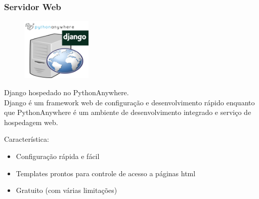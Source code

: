 \documentclass{beamer}
\begin{document}
\begin{frame}
\frametitle{Servidor Web}
\begin{minipage}{\textwidth}

	\begin{figure}
		\begin{center}
				\includegraphics[width=0.3\textwidth]{web-server-pa-django.png}
		\end{center}
	\end{figure}
	
	
	
	Django hospedado no PythonAnywhere. \\
	Django é um framework web de configuração e desenvolvimento rápido enquanto que PythonAnywhere é um ambiente de desenvolvimento integrado e serviço de hospedagem web.
	
	Característica:
	
	
	\begin{itemize}
		\item Configuração rápida e fácil
		\item Templates prontos para controle de acesso a páginas html
		\item Gratuito (com várias limitações)
	\end{itemize}
		
\end{minipage}
\end{frame}
\end{document}
